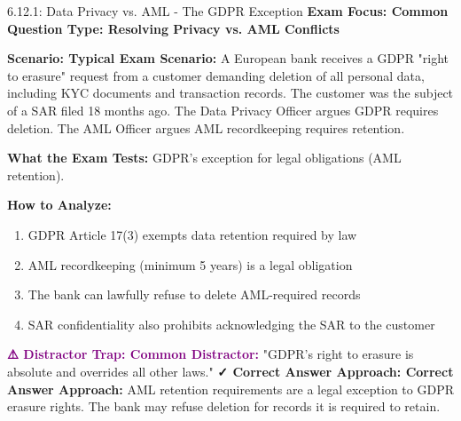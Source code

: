 \documentclass[11pt,a4paper]{beamer}
\newcommand{\examfocus}[1]{\textcolor{orange!80!black}{\textbf{Exam Focus: #1}}}
\newcommand{\trap}[1]{\textcolor{purple}{\textbf{⚠️ Distractor Trap: #1}}}
\newcommand{\correct}[1]{\textcolor{green!50!black}{\textbf{✓ Correct Answer Approach: #1}}}
\newcommand{\scenario}[1]{\textcolor{blue!70!black}{\textbf{Scenario: #1}}}
\begin{document}
	\begin{frame}{6.12.1: Data Privacy vs. AML - The GDPR Exception}
		\examfocus{Common Question Type: Resolving Privacy vs. AML Conflicts}
		
		\scenario{Typical Exam Scenario:}
		A European bank receives a GDPR "right to erasure" request from a customer demanding deletion of all personal data, including KYC documents and transaction records. The customer was the subject of a SAR filed 18 months ago. The Data Privacy Officer argues GDPR requires deletion. The AML Officer argues AML recordkeeping requires retention.
		
		\textbf{What the Exam Tests:} GDPR's exception for legal obligations (AML retention).
		
		\textbf{How to Analyze:}
		\begin{enumerate}
			\item GDPR Article 17(3) exempts data retention required by law
			\item AML recordkeeping (minimum 5 years) is a legal obligation
			\item The bank can lawfully refuse to delete AML-required records
			\item SAR confidentiality also prohibits acknowledging the SAR to the customer
		\end{enumerate}
		
		\trap{Common Distractor:} "GDPR's right to erasure is absolute and overrides all other laws."
		\correct{Correct Answer Approach:} AML retention requirements are a legal exception to GDPR erasure rights. The bank may refuse deletion for records it is required to retain.
	\end{frame}
	
\end{document}
